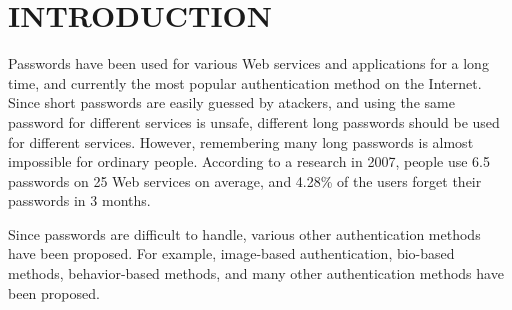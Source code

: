 \documentclass{article}
\begin{document}




\section{INTRODUCTION}

% 

Passwords have been used for various Web services and applications
for a long time, and currently the most popular authentication method on the Internet.
%
Since short passwords are easily guessed by atackers, and
using the same password for different services is unsafe,
different long passwords should be used for different services.
However,
remembering many long passwords is almost impossible for ordinary people.
%
According to a research in 2007,
people use 6.5 passwords on 25 Web services on average, and
4.28\% of the users forget their passwords in 3 months\cite{Florencio:2007:LSW:1242572.1242661}.



%   

Since passwords are difficult to handle,
various other authentication methods have been proposed.
For example,
image-based authentication\cite{Biddle:2012:GPL:2333112.2333114}\cite{小池英樹:2006-05-15}\cite{GraphicalPasswords}, 
bio-based methods\cite{},
behavior-based methods\cite{},
and many other authentication methods have been proposed.
\end{document}
